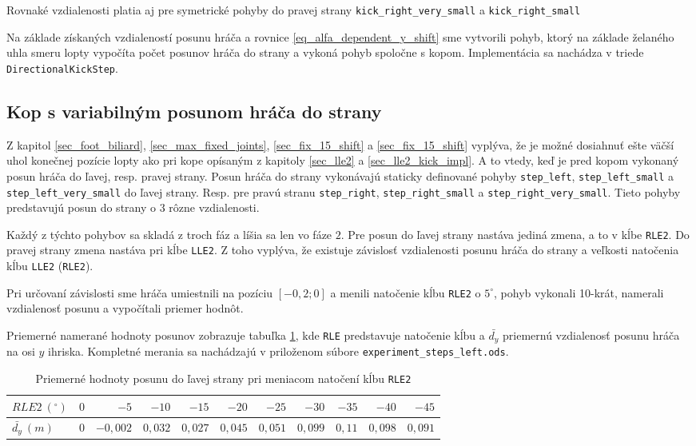 Rovnaké vzdialenosti platia aj pre symetrické pohyby do pravej strany \newline\texttt{kick\_right\_very\_small} a \texttt{kick\_right\_small}

Na základe získaných vzdialeností posunu hráča a rovnice \ref{eq_alfa_dependent_y_shift} sme vytvorili pohyb, ktorý na základe želaného uhla smeru lopty vypočíta počet posunov hráča do strany a vykoná pohyb spoločne s kopom. Implementácia sa nachádza v triede \texttt{DirectionalKickStep}.

\subsection{Kop s variabilným posunom hráča do strany} \label{sec_var_shift_kick_impl}
Z kapitol \ref{sec_foot_biliard}, \ref{sec_max_fixed_joints}, \ref{sec_fix_15_shift} a \ref{sec_fix_15_shift} vyplýva, že je možné dosiahnuť ešte väčší uhol konečnej pozície lopty ako pri kope opísaným z kapitoly \ref{sec_lle2} a \ref{sec_lle2_kick_impl}. A to vtedy, keď je pred kopom vykonaný posun hráča do ľavej, resp. pravej strany. Posun hráča do strany vykonávajú staticky definované pohyby \texttt{step\_left}, \texttt{step\_left\_small} a \texttt{step\_left\_very\_small} do ľavej strany. Resp. pre pravú stranu \texttt{step\_right}, \texttt{step\_right\_small} a \texttt{step\_right\_very\_small}. Tieto pohyby predstavujú posun do strany o $3$ rôzne vzdialenosti.

Každý z týchto pohybov sa skladá z troch fáz a líšia sa len vo fáze $2$. Pre posun do ľavej strany nastáva jediná zmena, a to v kĺbe \texttt{RLE2}. Do pravej strany zmena nastáva pri kĺbe \texttt{LLE2}. Z toho vyplýva, že existuje závislosť vzdialenosti posunu hráča do strany a veľkosti natočenia kĺbu \texttt{LLE2} (\texttt{RLE2}). 

Pri určovaní závislosti sme hráča umiestnili na pozíciu $[-0,2;0]$ a menili natočenie kĺbu \texttt{RLE2} o $5^{\circ}$, pohyb vykonali 10-krát, namerali vzdialenosť posunu a vypočítali priemer hodnôt.

Priemerné namerané hodnoty posunov zobrazuje tabuľka \ref{tab_step_left_RLE2}, kde \texttt{RLE} predstavuje natočenie kĺbu a $\bar{d_y}$ priemernú vzdialenosť posunu hráča na osi $y$ ihriska. Kompletné merania sa nachádzajú v priloženom súbore \newline\texttt{experiment\_steps\_left.ods}.

\begin{table}[H]
	\centering
	\footnotesize
	\begin{tabular}{||l||r|r|r|r|r|r|r|r|r|r||}
		\hline
		\hline
		$RLE2~(^{\circ})$ & $0$ & $-5$ & $-10$ & $-15$ & $-20$ & $-25$ & $-30$ & $-35$ & $-40$ & $-45$ \\
		\hline
		$\bar{d_y}~(m)$ & $0$ & $-0,002$ & $0,032$ & $0,027$ & $0,045$ & $0,051$ & $0,099$ & $0,11$ & $0,098$ & $0,091$ \\
		\hline
		\hline
	\end{tabular}
	\caption{Priemerné hodnoty posunu do ľavej strany pri meniacom natočení kĺbu \texttt{RLE2}}
	\label{tab_step_left_RLE2}
\end{table}

